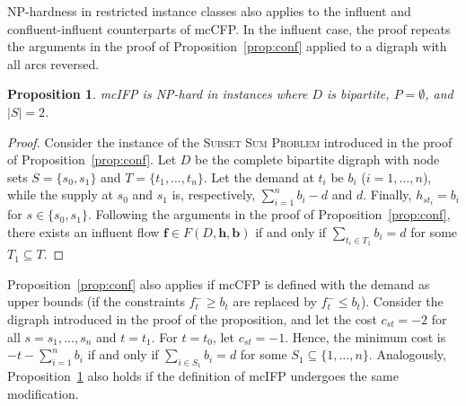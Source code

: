\documentclass[pdflatex,sn-mathphys-num]{sn-jnl}%
\theoremstyle{thmstyleone}%
\newtheorem{proposition}[theorem]{Proposition}%
\begin{document}
NP-hardness in restricted instance classes also applies to the influent and confluent-influent counterparts of mcCFP.
In the influent case, the proof repeats the arguments in the proof of Proposition~\ref{prop:conf} applied to a digraph with all arcs reversed.
\begin{proposition} \label{prop:inf}
mcIFP is NP-hard in instances where $D$ is bipartite, $P=\emptyset$, and $|S|=2$.
\end{proposition}
\begin{proof}
Consider the instance of the \textsc{Subset Sum Problem} introduced in the proof of Proposition~\ref{prop:conf}.
Let $D$ be the complete bipartite digraph with node sets $S=\{s_0,s_1\}$ and $T=\{t_1,\ldots,t_n\}$.
Let the demand at $t_i$ be $b_i$ ($i=1,\ldots,n$), while the supply at $s_0$ and $s_1$ is, respectively, $\sum_{i=1}^nb_i-d$ and $d$.
Finally, $h_{st_i}=b_i$ for $s\in\{s_0,s_1\}$.
Following the arguments in the proof of Proposition~\ref{prop:conf}, there exists an influent flow $\boldsymbol{f}\in F(D,\boldsymbol{h},\boldsymbol{b})$
if and only if $\sum_{t_i\in T_1}b_i=d$ for some $T_1\subseteq T$.
\end{proof}

Proposition~\ref{prop:conf} also applies if mcCFP is defined with the demand as upper bounds
(if the constraints $f_t^-\geq b_t$ are replaced by $f_t^-\leq b_t$).
Consider the digraph introduced in the proof of the proposition, and let the cost $c_{st}=-2$ for all $s=s_1,\ldots,s_n$ and $t=t_1$.
For $t=t_0$, let $c_{st}=-1$.
Hence, the minimum cost is $-t-\sum_{i=1}^nb_i$ if and only if $\sum_{i\in S_1}b_i=d$ for some $S_1\subseteq\{1,\ldots,n\}$.
Analogously, Proposition~\ref{prop:inf} also holds if the definition of mcIFP undergoes the same modification.
\end{document}
